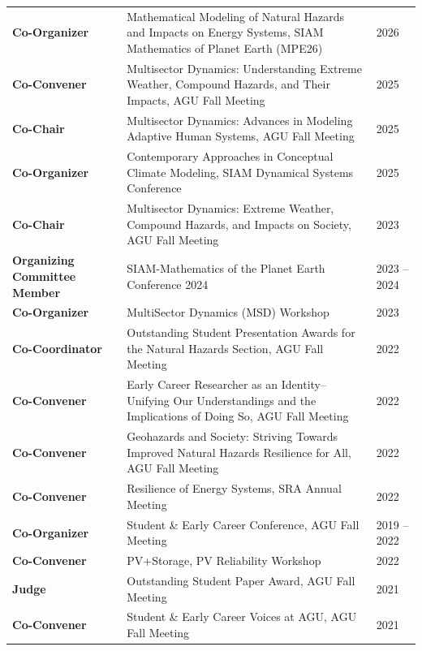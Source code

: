 \documentclass{article}[12pt]
\begin{document}
\begin{flushleft}
\begin{tabularx}{\textwidth}{lXl}
			\textbf{Co-Organizer} & Mathematical Modeling of Natural Hazards and Impacts on Energy Systems, SIAM Mathematics of Planet Earth (MPE26) & 2026\\
			\textbf{Co-Convener} & Multisector Dynamics: Understanding Extreme Weather, Compound Hazards, and Their Impacts, AGU Fall Meeting & 2025 \\
			\textbf{Co-Chair} & Multisector Dynamics: Advances in Modeling Adaptive Human Systems, AGU Fall Meeting & 2025 \\
			\textbf{Co-Organizer} & Contemporary Approaches in Conceptual Climate Modeling, SIAM Dynamical Systems Conference & 2025 \\
			\textbf{Co-Chair} & Multisector Dynamics: Extreme Weather, Compound Hazards, and Impacts on Society, AGU Fall Meeting & 2023 \\
			\textbf{Organizing Committee Member} & SIAM-Mathematics of the Planet Earth \newline Conference 2024 & 2023 -- 2024 \\
			\textbf{Co-Organizer} & MultiSector Dynamics (MSD) Workshop & 2023 \\
			\textbf{Co-Coordinator} & Outstanding Student Presentation Awards for the Natural Hazards Section, AGU Fall Meeting & 2022 \\
			\textbf{Co-Convener} & 	Early Career Researcher as an Identity–Unifying Our Understandings and the Implications of \newline Doing So, AGU Fall Meeting & 2022 \\
			\textbf{Co-Convener} & Geohazards and Society: Striving Towards Improved Natural Hazards Resilience for All, \newline AGU Fall Meeting & 2022 \\
			\textbf{Co-Convener} & Resilience of Energy Systems, \newline SRA Annual Meeting & 2022 \\
			\textbf{Co-Organizer} &  Student \& Early Career Conference, \newline AGU Fall Meeting & 2019 -- 2022 \\
			\textbf{Co-Convener} & PV+Storage, \newline PV Reliability Workshop & 2022 \\
			\textbf{Judge} & Outstanding Student Paper Award, \newline AGU Fall Meeting & 2021 \\
			\textbf{Co-Convener} & Student \& Early Career Voices at AGU, \newline AGU Fall Meeting  & 2021  \\

\end{tabularx}
\end{flushleft}
\end{document}
